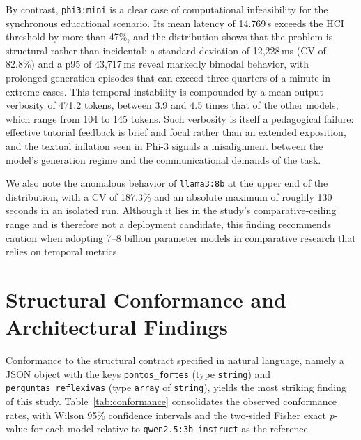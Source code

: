 \documentclass{sbc2023}%
\begin{document}
By contrast, \texttt{phi3:mini} is a clear case of computational infeasibility for the synchronous educational scenario. Its mean latency of 14.769\,s exceeds the HCI threshold by more than 47\%, and the distribution shows that the problem is structural rather than incidental: a standard deviation of 12,228\,ms (CV of 82.8\%) and a p95 of 43,717\,ms reveal markedly bimodal behavior, with prolonged-generation episodes that can exceed three quarters of a minute in extreme cases. This temporal instability is compounded by a mean output verbosity of 471.2 tokens, between 3.9 and 4.5 times that of the other models, which range from 104 to 145 tokens. Such verbosity is itself a pedagogical failure: effective tutorial feedback is brief and focal rather than an extended exposition, and the textual inflation seen in Phi-3 signals a misalignment between the model's generation regime and the communicational demands of the task.

We also note the anomalous behavior of \texttt{llama3:8b} at the upper end of the distribution, with a CV of 187.3\% and an absolute maximum of roughly 130 seconds in an isolated run. Although it lies in the study's comparative-ceiling range and is therefore not a deployment candidate, this finding recommends caution when adopting 7--8 billion parameter models in comparative research that relies on temporal metrics.

\section{Structural Conformance and Architectural Findings}
\label{sec:conformance}

Conformance to the structural contract specified in natural language, namely a JSON object with the keys \texttt{pontos\_fortes} (type \texttt{string}) and \texttt{perguntas\_reflexivas} (type \texttt{array} of \texttt{string}), yields the most striking finding of this study. Table~\ref{tab:conformance} consolidates the observed conformance rates, with Wilson 95\% confidence intervals and the two-sided Fisher exact \textit{p}-value for each model relative to \texttt{qwen2.5:3b-instruct} as the reference.
\end{document}
